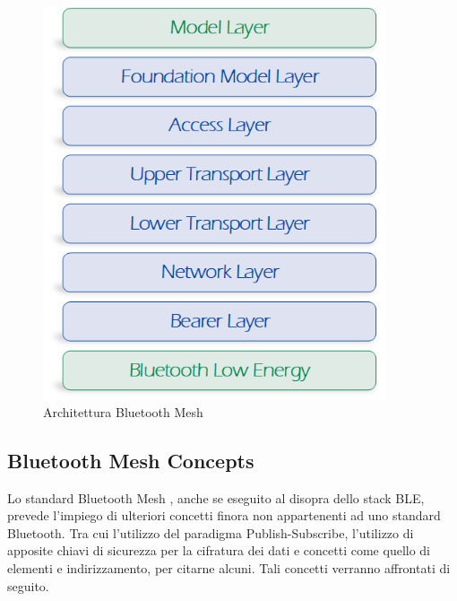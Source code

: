 \begin{figure}[!hb]
    \centering
    \includegraphics[width = 0.9\textwidth]{images/Layer BLE Mesh.png}
    \caption{Architettura Bluetooth Mesh}
    \label{fig:ble_mesh_architecture}
\end{figure}

\subsection{Bluetooth Mesh Concepts}
Lo standard Bluetooth Mesh \cite{blemesh2017, bluetooth2019b}, anche se eseguito al disopra dello stack BLE, prevede l'impiego di ulteriori concetti finora non appartenenti ad uno standard Bluetooth. Tra cui l'utilizzo del paradigma Publish-Subscribe, l'utilizzo di apposite chiavi di sicurezza per la cifratura dei dati e concetti come quello di elementi e indirizzamento, per citarne alcuni. 
Tali concetti verranno affrontati di seguito.

